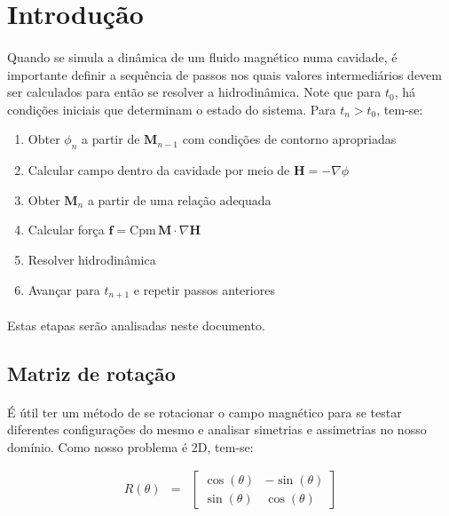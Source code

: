 \documentclass[introducao.tex]{subfiles}
\begin{document}
\section{Introdução}
\paragraph{} Quando se simula a dinâmica de um fluido magnético numa cavidade, é importante definir a sequência de passos nos quais valores intermediários devem ser calculados para então se resolver a hidrodinâmica. Note que para $t_0$, há condições iniciais que determinam o estado do sistema. Para $t_n > t_0$, tem-se:

\begin{enumerate}
	\item Obter $\phi_n$ a partir de $\mathbf{M}_{n-1}$ com condições de contorno apropriadas
	\item Calcular campo dentro da cavidade por meio de $\mathbf{H} = -\nabla \phi$
	\item Obter $\mathbf{M}_{n}$ a partir de uma relação adequada
	\item Calcular força $\mathbf{f} = \mathrm{Cpm}\,\mathbf{M}\cdot \nabla \mathbf{H}$
	\item Resolver hidrodinâmica
	\item Avançar para $t_{n+1}$ e repetir passos anteriores
\end{enumerate}

\paragraph{} Estas etapas serão analisadas neste documento.

\subsection{Matriz de rotação}
\paragraph{} É útil ter um método de se rotacionar o campo magnético para se testar diferentes configurações do mesmo e analisar simetrias e assimetrias no nosso domínio. Como nosso problema é 2D, tem-se:

\begin{eqnarray}
R(\theta) & =& \left[\begin{array}{cc}
\cos(\theta) & -\sin(\theta)\\
\sin(\theta)  & \cos(\theta)
\end{array}\right]
\end{eqnarray}
\end{document}
